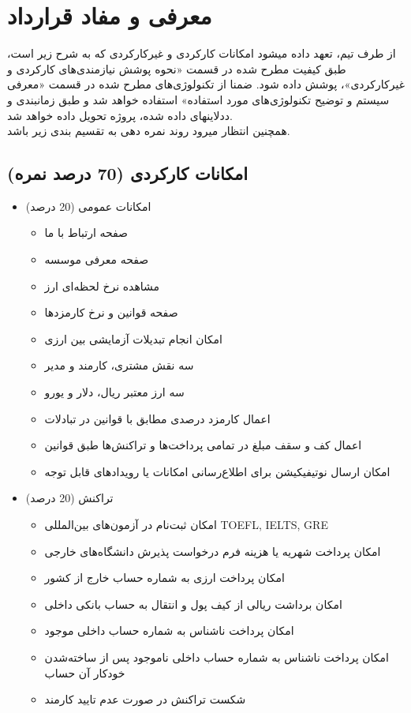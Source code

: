 \documentclass{article}
\begin{document}
\section{معرفی و مفاد قرارداد}
از طرف تیم، تعهد داده میشود امکانات کارکردی و غیرکارکردی که به شرح زیر است، طبق کیفیت مطرح شده در قسمت «نحوه پوشش نیازمندی‌های کارکردی و غیرکارکردی»، پوشش داده شود. ضمنا از تکنولوژی‌های مطرح شده در قسمت «معرفی سیستم و توضیح تکنولوژی‌های مورد استفاده» استفاده خواهد شد و طبق زمانبندی و ددلاینهای داده شده، پروژه تحویل داده خواهد شد.\\
همچنین انتظار میرود روند نمره دهی به تقسیم بندی زیر باشد.
\subsection{امکانات کارکردی (70 درصد نمره)}
\begin{itemize}
\item 
امکانات عمومی (20 درصد)
\begin{itemize}
\item
صفحه ارتباط با ما
\item
صفحه معرفی موسسه
\item
مشاهده نرخ لحظه‌ای ارز
\item
صفحه قوانین و نرخ کارمزد‌ها
\item
امکان انجام تبدیلات آزمایشی بین ارزی
\item
سه نقش مشتری، کارمند و مدیر
\item
سه ارز معتبر ریال، دلار و یورو
\item
اعمال کارمزد درصدی مطابق با قوانین در تبادلات
\item
اعمال کف و سقف مبلغ در تمامی پرداخت‌ها و تراکنش‌ها طبق قوانین
\item
امکان ارسال نوتیفیکیشن برای اطلاع‌رسانی امکانات یا رویداد‌های قابل توجه
\end{itemize}
\item
تراکنش‌ (20 درصد)
\begin{itemize}
\item
امکان ثبت‌نام در آزمون‌های بین‌المللی TOEFL, IELTS, GRE
\item
امکان پرداخت شهریه یا هزینه‌ فرم درخواست پذیرش دانشگاه‌های خارجی
\item
امکان پرداخت ارزی به شماره حساب خارج از کشور
\item
امکان برداشت ریالی از کیف پول و انتقال به حساب بانکی داخلی
\item
امکان پرداخت ناشناس به شماره حساب داخلی موجود
\item
امکان پرداخت ناشناس به شماره حساب داخلی ناموجود پس از ساخته‌شدن خود‌کار آن حساب
\item
شکست تراکنش در صورت عدم تایید کارمند


\end{itemize}
\end{itemize}
\end{document}
